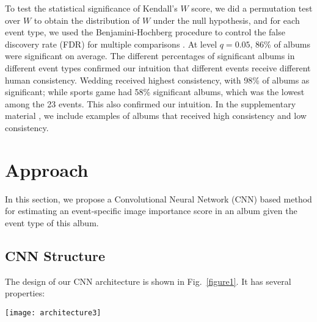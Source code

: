 \documentclass[10pt,twocolumn,letterpaper]{article}
\begin{document}
To test the statistical significance of Kendall's $W$ score, we did a permutation test over $W$ to obtain the distribution of $W$ under the null hypothesis, and for each event type, we used the Benjamini-Hochberg procedure to control the false discovery rate (FDR) for multiple comparisons \cite{Benjamini01thecontrol}. At level $q = 0.05$, 86\% of albums were significant on average. The different percentages of significant albums in different event types confirmed our intuition that different events receive different human consistency. Wedding received highest consistency, with 98\% of albums as significant; while sports game had 58\% significant albums, which was the lowest among the 23 events. This also confirmed our intuition. In the supplementary material \cite{supplementary}, we include examples of albums that received high consistency and low consistency.

\section{Approach}
In this section, we propose a Convolutional Neural Network (CNN) based method for estimating an event-specific image importance score in an album given the event type of this album.

\subsection{CNN Structure}
\label{CNN_section}
The design of our CNN architecture is shown in Fig.~\ref{figure1}. It has several properties:

\begin{figure*}[!htb]
\begin{center}
\texttt{[image: architecture3]}
\end{center}
\caption{A siamese CNN architecture for joint training over events. A pair of images from the same album is the input to the two identical network branches that share the same set of parameters. Intermediate layers are omitted here for simplicity. In the last fully connected layer, only the units corresponding to the correct event type are activated and back-propagated. The output score in the last fully connected layer from one half of the network is the prediction of the importance score of the corresponding input image. The piecewise Ranking loss is used to train the network.}
\label{figure1}
\end{figure*}
\end{document}
